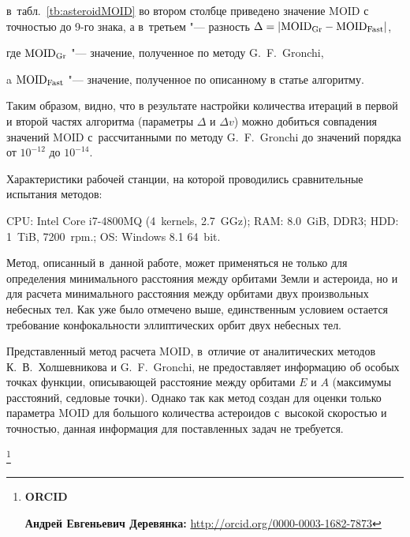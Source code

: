 в~табл.~\ref{tb:asteroidMOID} во втором столбце приведено значение MOID с точностью до 9-го знака, а в~третьем "--- разность $\Delta = \left|\rm MOID_{\rm Gr} - MOID_{\rm Fast} \right|$, 

где $\rm MOID_{\rm Gr}$ "--- значение, полученное по методу G.~F.~Gronchi, 

a $\rm MOID_{Fast\rm }$ "--- значение, полученное по описанному в статье алгоритму. 

Таким образом, видно, что в результате настройки количества итераций в первой и второй частях алгоритма (параметры $\Delta$ и $\Delta v$) можно добиться совпадения значений MOID с~рассчитанными по методу G.~F.~Gronchi до значений порядка от $10^{-12}$ до $10^{-14}$.



Характеристики рабочей станции, на которой проводились сравнительные испытания методов: 

CPU: Intel Core i7-4800MQ (4~kernels, 2.7~GGz); RAM: 8.0~GiB, DDR3; HDD: 1~TiB, 7200~rpm.; OS: Windows 8.1 64~bit.



Метод, описанный в~данной работе, может применяться не только для определения минимального расстояния между орбитами Земли и астероида, но и для расчета минимального расстояния между орбитами двух произвольных небесных тел. Как уже было отмечено выше, единственным условием остается требование конфокальности эллиптических орбит двух небесных тел.



Представленный метод расчета MOID, в~отличие от аналитических методов К.~В.~Холшевникова и G.~F.~Gronchi, не предоставляет информацию об особых точках функции, описывающей расстояние между орбитами $E$ и $A$ (максимумы расстояний, седловые точки). Однако так как метод создан для оценки только параметра MOID для большого количества астероидов с~высокой скоростью и точностью, данная информация для поставленных задач не требуется. 








\thanks{{\bf ORCID}



{\bf Андрей Евгеньевич Деревянка:} \url{http://orcid.org/0000-0003-1682-7873}





}



